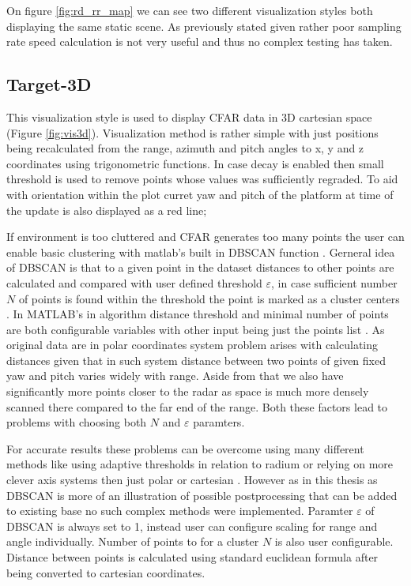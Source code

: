 On figure \ref{fig:rd_rr_map} we can see two different visualization styles both displaying the same static scene.
As previously stated given rather poor sampling rate speed calculation is not very useful and thus no complex testing has taken.

\subsection{Target-3D}

This visualization style is used to display CFAR data in 3D cartesian space (Figure \ref{fig:vis3d}).
Visualization method is rather simple with just positions being recalculated from the range, azimuth and pitch angles to x, y and z coordinates using trigonometric functions.
In case decay is enabled then small threshold is used to remove points whose values was sufficiently regraded.
To aid with orientation within the plot curret yaw and pitch of the platform at time of the update is also displayed as a red line;

If environment is too cluttered and CFAR generates too many points the user can enable basic clustering with matlab's built in DBSCAN function \cite{matlab_dbscan}.
Gerneral idea of DBSCAN is that to a given point in the dataset distances to other points are calculated and compared with user defined threshold $\varepsilon$, in case sufficient number $N$ of points is found within the threshold the point is marked as a cluster centers \cite{Kellner2012}.
In MATLAB's in algorithm distance threshold and minimal number of points are both configurable variables with other input being just the points list \cite{matlab_dbscan}.
As original data are in polar coordinates system problem arises with calculating distances given that in such system distance between two points of given fixed yaw and pitch varies widely with range.
Aside from that we also have significantly more points closer to the radar as space is much more densely scanned there compared to the far end of the range.
Both these factors lead to problems with choosing both $N$ and $\varepsilon$ paramters.

For accurate results these problems can be overcome using many different methods like using adaptive thresholds in relation to radium \cite{Kellner2012} or relying on more clever axis systems then just polar or cartesian \cite{Sun2024}.
However as in this thesis as DBSCAN is more of an illustration of possible postprocessing that can be added to existing base no such complex methods were implemented.
Paramter $\varepsilon$ of DBSCAN is always set to 1, instead user can configure scaling for range and angle individually.
Number of points to for a cluster $N$ is also user configurable.
Distance between points is calculated using standard euclidean formula after being converted to cartesian coordinates.


